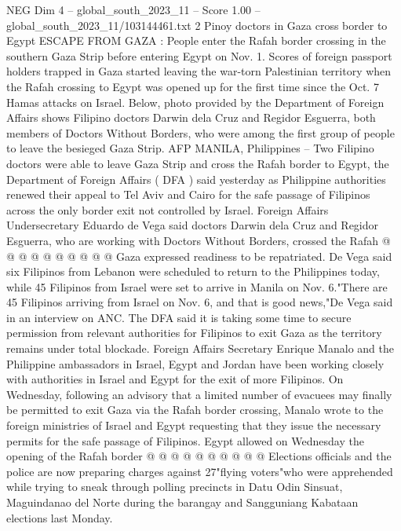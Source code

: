 \begin{textsample}{NEG Dim 4 – global\_south\_2023\_11 – Score 1.00 – global\_south\_2023\_11/103144461.txt}  \label{ex:f4_neg_295}
2 Pinoy doctors in Gaza cross border to Egypt ESCAPE FROM GAZA : People enter the Rafah border crossing in the southern Gaza Strip before entering Egypt on Nov. 1.
Scores of foreign passport holders trapped in Gaza started leaving the war-torn Palestinian territory when the Rafah crossing to Egypt was opened up for the first time since the Oct. 7 Hamas attacks on Israel.
Below, photo provided by the Department of Foreign Affairs shows Filipino doctors Darwin dela Cruz and Regidor Esguerra, both members of Doctors Without Borders, who were among the first group of people to leave the besieged Gaza Strip.
AFP MANILA, Philippines -- Two Filipino doctors were able to leave Gaza Strip and cross the Rafah border to Egypt, the Department of Foreign Affairs ( DFA ) said yesterday as Philippine authorities renewed their appeal to Tel Aviv and Cairo for the safe passage of Filipinos across the only border exit not controlled by Israel.
Foreign Affairs Undersecretary Eduardo de Vega said doctors Darwin dela Cruz and Regidor Esguerra, who are working with Doctors Without Borders, crossed the Rafah @ @ @ @ @ @ @ @ @ @ Gaza expressed readiness to be repatriated.
De Vega said six Filipinos from Lebanon were scheduled to return to the Philippines today, while 45 Filipinos from Israel were set to arrive in Manila on Nov. 6."There are 45 Filipinos arriving from Israel on Nov. 6, and that is good news,"De Vega said in an interview on ANC.
The DFA said it is taking some time to secure permission from relevant authorities for Filipinos to exit Gaza as the territory remains under total blockade.
Foreign Affairs Secretary Enrique Manalo and the Philippine ambassadors in Israel, Egypt and Jordan have been working closely with authorities in Israel and Egypt for the exit of more Filipinos.
On Wednesday, following an advisory that a limited number of evacuees may finally be permitted to exit Gaza via the Rafah border crossing, Manalo wrote to the foreign ministries of Israel and Egypt requesting that they issue the necessary permits for the safe passage of Filipinos.
Egypt allowed on Wednesday the opening of the Rafah border @ @ @ @ @ @ @ @ @ @ Elections officials and the police are now preparing charges against 27"flying voters"who were apprehended while trying to sneak through polling precincts in Datu Odin Sinsuat, Maguindanao del Norte during the barangay and Sangguniang Kabataan elections last Monday.

\end{textsample}
